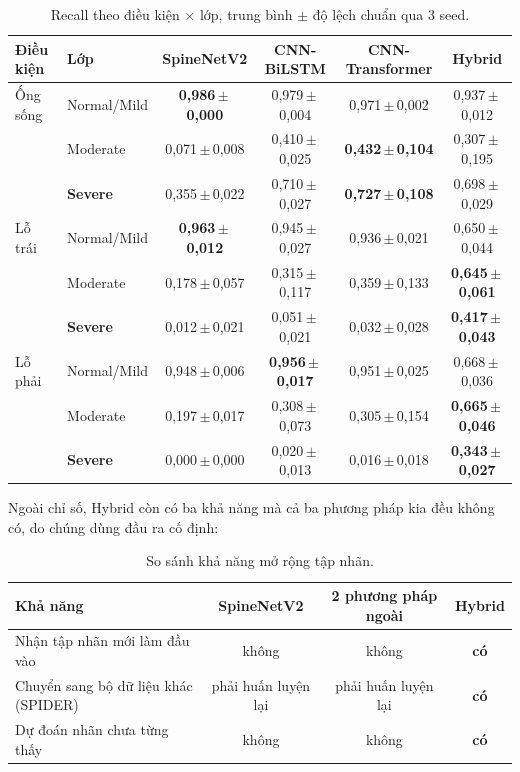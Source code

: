 \documentclass[11pt,a4paper]{article}
\begin{document}
\begin{table}[htbp]\centering\small
\caption{Recall theo điều kiện $\times$ lớp, trung bình $\pm$ độ lệch chuẩn qua 3 seed.}
\label{tab:sota-recall}
\setlength{\tabcolsep}{4pt}
\begin{tabular}{llcccc}\toprule
\textbf{Điều kiện} & \textbf{Lớp} & \textbf{SpineNetV2} & \textbf{CNN-BiLSTM} & \textbf{CNN-Transformer} & \textbf{Hybrid} \\\midrule
Ống sống & Normal/Mild & \textbf{0{,}986\,$\pm$\,0{,}000} & 0{,}979\,$\pm$\,0{,}004 & 0{,}971\,$\pm$\,0{,}002 & 0{,}937\,$\pm$\,0{,}012 \\
 & Moderate & 0{,}071\,$\pm$\,0{,}008 & 0{,}410\,$\pm$\,0{,}025 & \textbf{0{,}432\,$\pm$\,0{,}104} & 0{,}307\,$\pm$\,0{,}195 \\
 & \textbf{Severe} & 0{,}355\,$\pm$\,0{,}022 & 0{,}710\,$\pm$\,0{,}027 & \textbf{0{,}727\,$\pm$\,0{,}108} & 0{,}698\,$\pm$\,0{,}029 \\
\midrule
Lỗ trái & Normal/Mild & \textbf{0{,}963\,$\pm$\,0{,}012} & 0{,}945\,$\pm$\,0{,}027 & 0{,}936\,$\pm$\,0{,}021 & 0{,}650\,$\pm$\,0{,}044 \\
 & Moderate & 0{,}178\,$\pm$\,0{,}057 & 0{,}315\,$\pm$\,0{,}117 & 0{,}359\,$\pm$\,0{,}133 & \textbf{0{,}645\,$\pm$\,0{,}061} \\
 & \textbf{Severe} & 0{,}012\,$\pm$\,0{,}021 & 0{,}051\,$\pm$\,0{,}021 & 0{,}032\,$\pm$\,0{,}028 & \textbf{0{,}417\,$\pm$\,0{,}043} \\
\midrule
Lỗ phải & Normal/Mild & 0{,}948\,$\pm$\,0{,}006 & \textbf{0{,}956\,$\pm$\,0{,}017} & 0{,}951\,$\pm$\,0{,}025 & 0{,}668\,$\pm$\,0{,}036 \\
 & Moderate & 0{,}197\,$\pm$\,0{,}017 & 0{,}308\,$\pm$\,0{,}073 & 0{,}305\,$\pm$\,0{,}154 & \textbf{0{,}665\,$\pm$\,0{,}046} \\
 & \textbf{Severe} & 0{,}000\,$\pm$\,0{,}000 & 0{,}020\,$\pm$\,0{,}013 & 0{,}016\,$\pm$\,0{,}018 & \textbf{0{,}343\,$\pm$\,0{,}027} \\
\bottomrule\end{tabular}\end{table}



Ngoài chỉ số, Hybrid còn có ba khả năng mà cả ba phương pháp kia đều không có, do chúng dùng đầu
ra cố định:

\begin{table}[htbp]
\centering\small
\caption{So sánh khả năng mở rộng tập nhãn.}
\label{tab:sota-cap}
\begin{tabular}{lccc}
\toprule
\textbf{Khả năng} & \textbf{SpineNetV2} & \textbf{2 phương pháp ngoài} & \textbf{Hybrid} \\
\midrule
Nhận tập nhãn mới làm đầu vào      & không & không & \textbf{có} \\
Chuyển sang bộ dữ liệu khác (SPIDER) & phải huấn luyện lại & phải huấn luyện lại & \textbf{có} \\
Dự đoán nhãn chưa từng thấy         & không & không & \textbf{có} \\
\bottomrule
\end{tabular}
\end{table}
\end{document}
